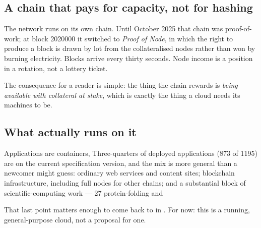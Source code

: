 \subsection{A chain that pays for capacity, not for hashing}

The network runs on its own chain. Until October 2025 that chain was proof-of-work; at block
\num{2020000} it switched to \emph{Proof of Node}, in which the right to produce a block is drawn
by lot from the collateralised nodes rather than won by burning electricity. Blocks arrive every
thirty seconds. Node income is a position in a rotation, not a lottery ticket.

The consequence for a reader is simple: the thing the chain rewards is \emph{being available with
collateral at stake}, which is exactly the thing a cloud needs its machines to be.

\subsection{What actually runs on it}

Applications are containers,  Three-quarters of deployed applications (\num{873} of \num{1195}) are on the
current specification version, and the mix is more general than a newcomer might guess: ordinary web
services and content sites; blockchain infrastructure, including full nodes for other chains;
and a substantial block of scientific-computing work --- \num{27} protein-folding and

That last point matters enough to come back to in . For now: this is a
running, general-purpose cloud, not a proposal for one.

